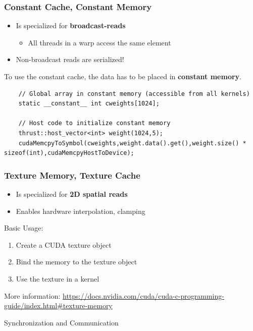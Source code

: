 \documentclass[aspectratio=169,handout]{beamer}
\begin{document}
\begin{frame}[fragile]
	\frametitle{Constant Cache, Constant Memory}
	\begin{itemize}
		\item Is specialized for \textbf{broadcast-reads}
		\begin{itemize}
			\item All threads in a warp access the same element
		\end{itemize}
		\item Non-broadcast reads are serialized!
	\end{itemize}
	To use the constant cache, the data has to be placed in \textbf{constant memory}.
	\begin{lstlisting}
	// Global array in constant memory (accessible from all kernels)
	static __constant__ int cweights[1024];

	// Host code to initialize constant memory
	thrust::host_vector<int> weight(1024,5);
	cudaMemcpyToSymbol(cweights,weight.data().get(),weight.size() * 	   sizeof(int),cudaMemcpyHostToDevice);
	\end{lstlisting}
	

\end{frame}

\begin{frame}[fragile]
\frametitle{Texture Memory, Texture Cache}
	\begin{itemize}
		\item Is specialized for \textbf{2D spatial reads}
		\item Enables hardware interpolation, clamping 
	\end{itemize}
	Basic Usage:
\begin{enumerate}
	\item Create a CUDA texture object
	\item Bind the memory to the texture object
	\item Use the texture in a kernel
\end{enumerate}
\vspace{0.2cm}
More information: \url{https://docs.nvidia.com/cuda/cuda-c-programming-guide/index.html#texture-memory}
\end{frame}



\begin{frame}[fragile]
\begin{center}
\Large Synchronization and Communication
\end{center}
\end{frame}
\end{document}
